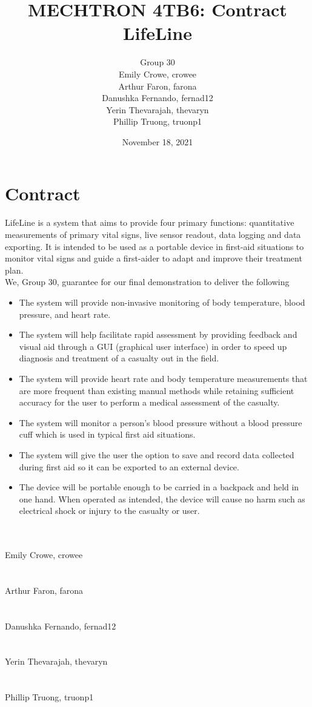 \documentclass{article}
\title{MECHTRON 4TB6: Contract \\ LifeLine}
\author{Group 30 \\ Emily Crowe, crowee \\ Arthur Faron, farona \\ Danushka Fernando, fernad12 \\Yerin Thevarajah, thevaryn \\ Phillip Truong, truonp1}
\begin{document}
    \date{November 18, 2021}
	\maketitle

	\newpage

	\section{Contract}
        LifeLine is a system that aims to provide four primary functions: quantitative measurements of primary vital signs, live sensor readout, data logging and data exporting. It is intended to be used as a portable device in first-aid situations to monitor vital signs and guide a first-aider to adapt and improve their treatment plan.\\
	
        We, Group 30, guarantee for our final demonstration to deliver the following
        \begin{itemize}
            \item The system will provide non-invasive monitoring of body temperature, blood pressure, and heart rate.     
            \item The system will help facilitate rapid assessment by providing feedback and visual aid through a GUI (graphical user interface) in order to speed up diagnosis and treatment of a casualty out in the field.
            \item The system will provide heart rate and body temperature measurements that are more frequent than existing manual methods while retaining sufficient accuracy for the user to perform a medical assessment of the casualty. 
            \item The system will monitor a person's blood pressure without a blood pressure cuff which is used in typical first aid situations.
            \item The system will give the user the option to save and record data collected during first aid so it can be exported to an external device. 
            \item The device will be portable enough to be carried in a backpack and held in one hand.  When operated as intended, the device will cause no harm such as electrical shock or injury to the casualty or user. \\ \\ \\
        \end{itemize} 
        
    Emily Crowe, crowee  \\ \\ \\

    Arthur Faron, farona \\ \\ \\
    
    Danushka Fernando, fernad12 \\ \\ \\

    Yerin Thevarajah, thevaryn \\ \\ \\
    
    Phillip Truong, truonp1
   
\end{document}
